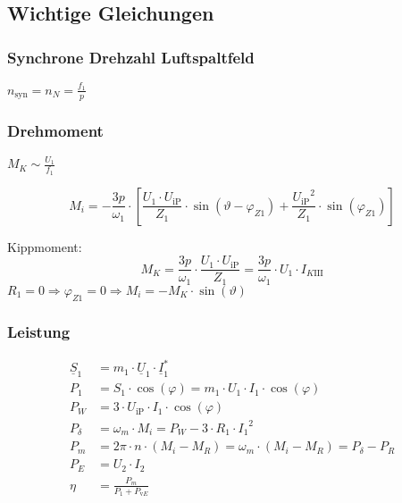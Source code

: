 \begin{sectionbox}
\subsection{Wichtige Gleichungen}
\subsubsection{Synchrone Drehzahl Luftspaltfeld}
\begin{emphbox}
  $n_\text{syn} = n_N = \frac{f_1}{p}$
\end{emphbox}

\subsubsection{Drehmoment}
\begin{emphbox}
  $M_K\sim \frac{U_1}{f_1}$
\end{emphbox}
\begin{emphbox}
  \[M_i = -\frac{3p}{\omega_1}\cdot\left[\frac{U_1\cdot U_\text{iP}}{Z_1}\cdot\sin{\left(\vartheta - \varphi_{Z1}\right)} + \frac{{U_\text{iP}}^2}{Z_1}\cdot\sin{\left(\varphi_{Z1}\right)}\right]\]
\end{emphbox}
Kippmoment:
\[M_K = \frac{3p}{\omega_1}\cdot\frac{U_1\cdot U_\text{iP}}{Z_1} = \frac{3p}{\omega_1}\cdot U_1\cdot I_{K\textrm{III}}\]
$R_1 = 0 \Rightarrow \varphi_{Z1} = 0 \Rightarrow M_i = -M_K\cdot\sin(\vartheta)$

\subsubsection{Leistung}
\begin{align*}
\underline{S}_1 &= m_1\cdot \underline{U}_1\cdot\underline{I}_1^*\\
P_1 &= S_1 \cdot\cos{(\varphi)} = m_1\cdot U_1\cdot I_1\cdot\cos{(\varphi)}\\
P_W &= 3\cdot U_\text{iP}\cdot I_1\cdot\cos{(\varphi)}\\
P_\delta &= \omega_m\cdot M_i = P_W - 3\cdot R_1\cdot {I_1}^2\\
P_m &= 2\pi\cdot n\cdot (M_i - M_R) = \omega_m\cdot (M_i - M_R) = P_\delta - P_R\\
P_E &= U_2\cdot I_2\\
\eta &= \frac{P_m}{P_1 + P_{\text{v}E}}
\end{align*}
\end{sectionbox}

